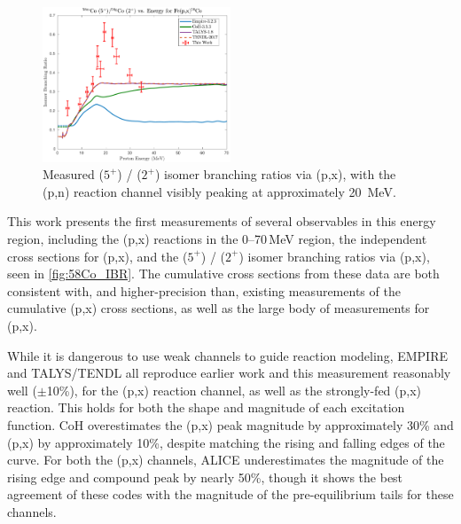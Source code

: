 \begin{figure}[h]
 \centering
 \includegraphics[width=0.5\textwidth]{./figures/58Co_IBR.pdf}
 \caption{Measured  ($5^+$) /   ($2^+$)  isomer branching ratios via (p,x), with the (p,n) reaction channel visibly peaking at approximately \mbox{20 MeV}.}
 \label{fig:58Co_IBR}
\end{figure}





This work presents the first measurements of several observables in 
this energy region, including the 
(p,x) reactions in the 0--70\,MeV region, 
the independent cross sections for      (p,x), and the  ($5^+$) /   ($2^+$)  isomer branching ratios via (p,x), seen in \autoref{fig:58Co_IBR}. 
The cumulative cross sections from these data are both consistent with, and higher-precision than, existing measurements of the cumulative (p,x) cross sections, as well as the large body of measurements for (p,x).

While it is dangerous to use weak channels to guide reaction modeling,
EMPIRE and TALYS/TENDL all reproduce earlier work and this measurement reasonably well ($\pm$10\%), for the (p,x) reaction channel, as well as the strongly-fed (p,x) reaction.
This holds for both the shape and magnitude of each excitation function.
CoH overestimates the (p,x) peak magnitude by approximately 30\% and  (p,x)  by approximately 10\%, despite matching the rising and falling edges of the curve.
For both the (p,x) channels, ALICE underestimates the magnitude of the rising edge and compound peak by nearly 50\%, though it shows the best agreement of these codes with the magnitude of the pre-equilibrium tails for these channels.

